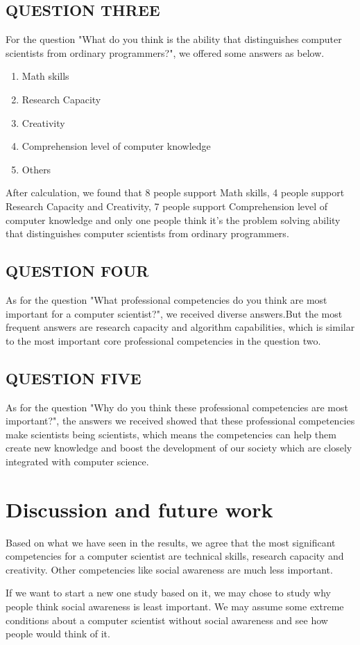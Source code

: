 \documentclass[conference]{IEEEtran}
\begin{document}
\subsection{QUESTION THREE}
\par For the question "What do you think is the ability that distinguishes computer scientists from ordinary programmers?", we offered some answers as below.
\begin{enumerate}
    \item Math skills
    \item Research Capacity
    \item Creativity
    \item Comprehension level of computer knowledge
    \item Others
\end{enumerate}
\par After calculation, we found that 8 people support Math skills, 4 people support Research Capacity and Creativity, 7 people support Comprehension level of computer knowledge and only one people think it's the problem solving ability that distinguishes computer scientists from ordinary programmers.

\subsection{QUESTION FOUR}
\par As for the question "What professional competencies do you think are most important for a computer scientist?", we received diverse answers.But the most frequent answers are research capacity and algorithm capabilities, which is similar to the most important core professional competencies in the question two.

\subsection{QUESTION FIVE}
\par As for the question "Why do you think these professional competencies are most important?", the answers we received showed that these professional competencies make scientists being scientists, which means the competencies can help them create new knowledge and boost the development of our society which are closely integrated with computer science.

\section{Discussion and future work}
\par Based on what we have seen in the results, we agree that the most significant competencies for a computer scientist are technical skills, research capacity and creativity. Other competencies like social awareness are much less important.
\par If we want to start a new one study based on it, we may chose to study why people think social awareness is least important. We may assume some extreme conditions about a computer scientist without social awareness and see how people would think of it.
\end{document}
